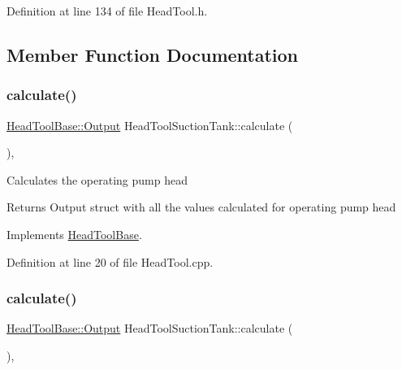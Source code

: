 Definition at line 134 of file Head\+Tool.\+h.



\subsection{Member Function Documentation}
\mbox{\label{class_head_tool_suction_tank_ad91b31b9f524b9892da26e5ecb9e191e}} 
\subsubsection{\texorpdfstring{calculate()}{calculate()}\hspace{0.1cm}{\footnotesize\ttfamily [1/3]}}
{\footnotesize\ttfamily \hyperlink{struct_head_tool_base_1_1_output}{Head\+Tool\+Base\+::\+Output} Head\+Tool\+Suction\+Tank\+::calculate (\begin{DoxyParamCaption}{ }\end{DoxyParamCaption})\hspace{0.3cm}{\ttfamily [override]}, {\ttfamily [virtual]}}

Calculates the operating pump head \begin{DoxyReturn}{Returns}
Output struct with all the values calculated for operating pump head 
\end{DoxyReturn}


Implements \hyperlink{class_head_tool_base_a82024c0ce01699aa24509c964267c392}{Head\+Tool\+Base}.



Definition at line 20 of file Head\+Tool.\+cpp.

\mbox{\label{class_head_tool_suction_tank_ad91b31b9f524b9892da26e5ecb9e191e}} 
\subsubsection{\texorpdfstring{calculate()}{calculate()}\hspace{0.1cm}{\footnotesize\ttfamily [2/3]}}
{\footnotesize\ttfamily \hyperlink{struct_head_tool_base_1_1_output}{Head\+Tool\+Base\+::\+Output} Head\+Tool\+Suction\+Tank\+::calculate (\begin{DoxyParamCaption}{ }\end{DoxyParamCaption})\hspace{0.3cm}{\ttfamily [override]}, {\ttfamily [virtual]}}

